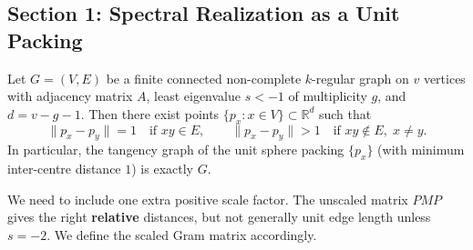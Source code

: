 \subsection*{Section 1: Spectral Realization as a Unit Packing}

\begin{theorem}
\label{thm:spectral-realization}
Let $G=(V,E)$ be a finite connected non-complete $k$-regular graph on $v$ vertices with adjacency matrix $A$, least eigenvalue $s<-1$ of multiplicity $g$, and $d=v-g-1$. Then there exist points $\{p_x : x\in V\}\subset \mathbb{R}^d$ such that
\[
  \|p_x-p_y\|=1\quad\text{if }xy\in E,
  \qquad
  \|p_x-p_y\|>1\quad\text{if }xy\notin E,\; x\neq y.
\]
In particular, the tangency graph of the unit sphere packing $\{p_x\}$ (with minimum inter-centre distance $1$) is exactly $G$.
\end{theorem}

We need to include one extra positive scale factor. The unscaled matrix $PMP$ gives the right \textbf{relative} distances, but not generally unit edge length unless $s=-2$. We define the scaled Gram matrix accordingly.

